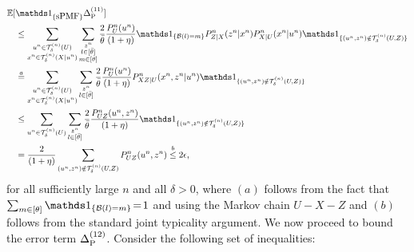 \begin{align*}
    \EE[&\Ipmf \peoneone] \\
    &\leq \sum_{\substack{\un \in \Tu  \\\xn \in \Txcond  }}  \sum_{\substack{ \zn \\l \in [\btheta]\\m\in [\theta] }} 
    \frac{2}{\btheta} \frac{P^n_U(\un)}{(1+\eta)} 
    \I_{\set{\calB(l) = m}} 
    P_{Z|X}^n(\zn|\xn) P_{X|U}^n(\xn|\un) \I_{\set{(\un,\zn) \notin \Tuz}} \\
    &\overset{a}{=} \sum_{\substack{\un \in \Tu  \\\xn \in \Txcond  }}
   \sum_{\substack{ \zn \\ l \in [\btheta]}}
    \frac{2}{\btheta} \frac{P^n_U(\un)}{(1+\eta)}  
    P_{XZ|U}^n(\xn,\zn|\un)  \I_{\set{(\un,\zn) \notin \Tuz}} \\
    &\overset{}{\leq} \sum_{\substack{\un \in \Tu}}
   \sum_{\substack{ \zn \\ l \in [\btheta]}}
    \frac{2}{\btheta} \frac{P_{UZ}^n(\un,\zn)}{(1+\eta)}  
      \I_{\set{(\un,\zn) \notin \Tuz}} \\
    &=  \frac{2}{(1+\eta)} \sum_{(\un,\zn) \notin \Tuz}P_{UZ}^n(\un,\zn) \overset{b}{\leq} 2\epsilon,
\end{align*}
for all sufficiently large $n$ and all $\delta>0$, where $(a)$ follows from the fact that $\sum_{m \in [\theta]} \I_{\set{\calB(l) = m}} \!= \!1$ and using the Markov chain $U-X-Z$ and $(b)$ follows from the standard joint typicality argument. We now proceed to bound the error term $\Delta_{\text{P}}^{(12)}$. Consider the following set of inequalities:
